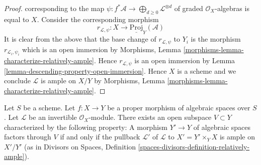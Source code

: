 \begin{proof}
corresponding to the map
$\psi : f^*\mathcal{A} \to \bigoplus_{d \geq 0} \mathcal{L}^{\otimes d}$
of graded $\mathcal{O}_X$-algebras
is equal to $X$. Consider the corresponding morphism
$$
r_{\mathcal{L}, \psi} : X \longrightarrow \underline{\text{Proj}}_Y(\mathcal{A})
$$
It is clear from the above that the base change of
$r_{\mathcal{L}, \psi}$ to $Y_i$ is the morphism
$r_{\mathcal{L}_i, \psi_i}$ which is an open immersion by
Morphisms, Lemma \ref{morphisms-lemma-characterize-relatively-ample}.
Hence $r_{\mathcal{L}, \psi}$ is an open immersion
by Lemma \ref{lemma-descending-property-open-immersion}.
Hence $X$ is a scheme
and we conclude $\mathcal{L}$ is ample on $X/Y$ by
Morphisms, Lemma \ref{morphisms-lemma-characterize-relatively-ample}.
\end{proof}

\begin{lemma}
\label{lemma-ample-in-neighbourhood}
Let $S$ be a scheme.
Let $f : X \to Y$ be a proper morphism of algebraic spaces over $S$.
Let $\mathcal{L}$ be an invertible $\mathcal{O}_X$-module.
There exists an open subspace $V \subset Y$ characterized by
the following property:
A morphism $Y' \to Y$ of algebraic spaces factors
through $V$ if and only if the pullback $\mathcal{L}'$
of $\mathcal{L}$ to $X' = Y' \times_Y X$ is ample on $X'/Y'$
(as in Divisors on Spaces, Definition
\ref{spaces-divisors-definition-relatively-ample}).
\end{lemma}

